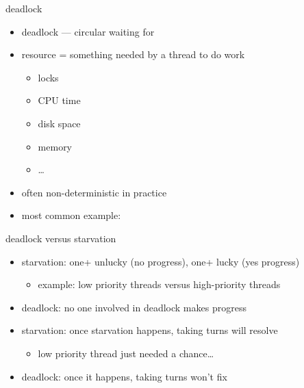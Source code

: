 \begin{frame}{deadlock}
\begin{itemize}
\item deadlock --- circular waiting for 
\vspace{.5cm}
\item resource = something needed by a thread to do work
  \begin{itemize}
  \item locks
  \item CPU time
  \item disk space
  \item memory
  \item \ldots
  \end{itemize}
\item often non-deterministic in practice
\item most common example: 
\end{itemize}
\end{frame}

\begin{frame}{deadlock versus starvation}
\begin{itemize}
\item starvation: one+ unlucky (no progress), 
                  one+ lucky (yes progress)
    \begin{itemize}
    \item example: low priority threads versus high-priority threads
    \end{itemize}
\item deadlock: no one involved in deadlock makes progress
\vspace{.5cm}
\item<2-> starvation: once starvation happens, taking turns will resolve
    \begin{itemize}
    \item low priority thread just needed a chance\ldots
    \end{itemize}
\item<2-> deadlock: once it happens, taking turns won't fix
\end{itemize}
\end{frame}
